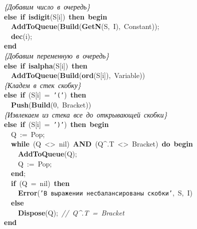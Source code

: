\mbox{}\ \ \ \ \ \ \textit{\{Добавим\ число\ в\ очередь\}} \\
\mbox{}\ \ \ \ \ \ \textbf{else}\ \textbf{if}\ \textbf{isdigit}(S[i])\ \textbf{then}\ \textbf{begin} \\
\mbox{}\ \ \ \ \ \ \ \ \textbf{AddToQueue}(\textbf{Build}(\textbf{GetN}(S,\ I),\ Constant)); \\
\mbox{}\ \ \ \ \ \ \ \ \textbf{dec}(i); \\
\mbox{}\ \ \ \ \ \ \textbf{end} \\
\mbox{}\ \ \ \ \ \ \textit{\{Добавим\ переменную\ в\ очередь\}} \\
\mbox{}\ \ \ \ \ \ \textbf{else}\ \textbf{if}\ \textbf{isalpha}(S[i])\ \textbf{then} \\
\mbox{}\ \ \ \ \ \ \ \ \textbf{AddToQueue}(\textbf{Build}(\textbf{ord}(S[i]),\ Variable)) \\
\mbox{}\ \ \ \ \ \ \textit{\{Кладем\ в\ стек\ скобку\}} \\
\mbox{}\ \ \ \ \ \ \textbf{else}\ \textbf{if}\ (S[i]\ =\ \texttt{'('})\ \textbf{then} \\
\mbox{}\ \ \ \ \ \ \ \ \textbf{Push}(\textbf{Build}(0,\ Bracket)) \\
\mbox{}\ \ \ \ \ \ \textit{\{Извлекаем\ из\ стека\ все\ до\ открывающей\ скобки\}} \\
\mbox{}\ \ \ \ \ \ \textbf{else}\ \textbf{if}\ (S[i]\ =\ \texttt{')'})\ \textbf{then}\ \textbf{begin} \\
\mbox{}\ \ \ \ \ \ \ \ Q\ :=\ Pop; \\
\mbox{}\ \ \ \ \ \ \ \ \textbf{while}\ (Q\ \textless{}\textgreater{}\ nil)\ \textbf{AND}\ (Q\textasciicircum{}.T\ \textless{}\textgreater{}\ Bracket)\ \textbf{do}\ \textbf{begin} \\
\mbox{}\ \ \ \ \ \ \ \ \ \ \textbf{AddToQueue}(Q); \\
\mbox{}\ \ \ \ \ \ \ \ \ \ Q\ :=\ Pop; \\
\mbox{}\ \ \ \ \ \ \ \ \textbf{end}; \\
\mbox{}\ \ \ \ \ \ \ \ \textbf{if}\ (Q\ =\ nil)\ \textbf{then} \\
\mbox{}\ \ \ \ \ \ \ \ \ \ \textbf{Error}(\texttt{'В\ выражении\ несбалансированы\ скобки'},\ S,\ I) \\
\mbox{}\ \ \ \ \ \ \ \ \textbf{else} \\
\mbox{}\ \ \ \ \ \ \ \ \ \ \textbf{Dispose}(Q);\ \textit{//\ Q\textasciicircum{}.T\ =\ Bracket} \\
\mbox{}\ \ \ \ \ \ \textbf{end} \\
